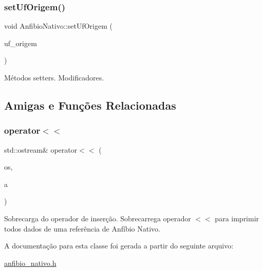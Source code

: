 \subsubsection{\texorpdfstring{set\+Uf\+Origem()}{setUfOrigem()}}
{\footnotesize\ttfamily void Anfibio\+Nativo\+::set\+Uf\+Origem (\begin{DoxyParamCaption}\item[{std\+::string}]{uf\+\_\+origem }\end{DoxyParamCaption})}

Métodos setters. Modificadores. 

\subsection{Amigas e Funções Relacionadas}
\mbox{\label{classAnfibioNativo_aa32bce187158a3ef855d1cb0229268a7}} 
\subsubsection{\texorpdfstring{operator$<$$<$}{operator<<}}
{\footnotesize\ttfamily std\+::ostream\& operator$<$$<$ (\begin{DoxyParamCaption}\item[{std\+::ostream \&}]{os,  }\item[{\hyperlink{classAnfibioNativo}{Anfibio\+Nativo} \&}]{a }\end{DoxyParamCaption})\hspace{0.3cm}{\ttfamily [friend]}}

Sobrecarga do operador de inserção. Sobrecarrega operador $<$$<$ para imprimir todos dados de uma referência de Anfíbio Nativo. 

A documentação para esta classe foi gerada a partir do seguinte arquivo\+:\begin{DoxyCompactItemize}
\item 
\hyperlink{anfibio__nativo_8h}{anfibio\+\_\+nativo.\+h}\end{DoxyCompactItemize}

